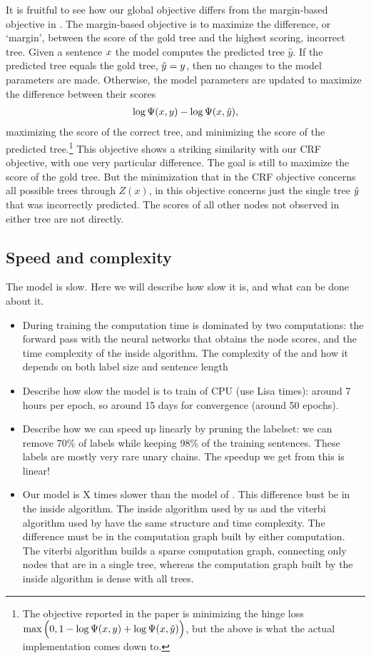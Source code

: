     It is fruitful to see how our global objective differs from the margin-based objective in \citep{stern2017minimal}. The margin-based objective is to maximize the difference, or `margin', between the score of the gold tree and the highest scoring, incorrect tree. Given a sentence $x$ the model computes the predicted tree $\hat{y}$. If the predicted tree equals the gold tree, $\hat{y} = y$, then no changes to the model parameters are made. Otherwise, the model parameters are updated to maximize the difference between their scores
    \begin{align*}
      \log \Psi(x, y) - \log \Psi(x, \hat{y}),
    \end{align*}
    maximizing the score of the correct tree, and minimizing the score of the predicted tree.\footnote{The objective reported in the paper is minimizing the hinge loss $\max \Big(0, 1 - \log \Psi(x, y) + \log \Psi(x, \hat{y}) \Big)$, but the above is what the actual implementation comes down to.} This objective shows a striking similarity with our CRF objective, with one very particular difference. The goal is still to maximize the score of the gold tree. But the minimization that in the CRF objective concerns all possible trees through $Z(x)$, in this objective concerns just the single tree $\hat{y}$ that was incorrectly predicted. The scores of all other nodes not observed in either tree are not directly.

  \subsection{Speed and complexity}
    The model is slow. Here we will describe how slow it is, and what can be done about it.
    \begin{itemize}
      \item During training the computation time is dominated by two computations: the forward pass with the neural networks that obtains the node scores, and the time complexity of the inside algorithm. The complexity of the and how it depends on both label size and sentence length
      \item Describe how slow the model is to train of CPU (use Lisa times): around 7 hours per epoch, so around 15 days for convergence (around 50 epochs).
      \item Describe how we can speed up linearly by pruning the labelset: we can remove 70\% of labels while keeping 98\% of the training sentences. These labels are mostly very rare unary chains. The speedup we get from this is linear!
      \item Our model is X times slower than the model of \citet{stern2017minimal}. This difference bust be in the inside algorithm. The inside algorithm used by us and the viterbi algorithm used by \citet{stern2017minimal} have the same structure and time complexity. The difference must be in the computation graph built by either computation. The viterbi algorithm builds a sparse computation graph, connecting only nodes that are in a single tree, whereas the computation graph built by the inside algorithm is dense with all trees.
    \end{itemize}

